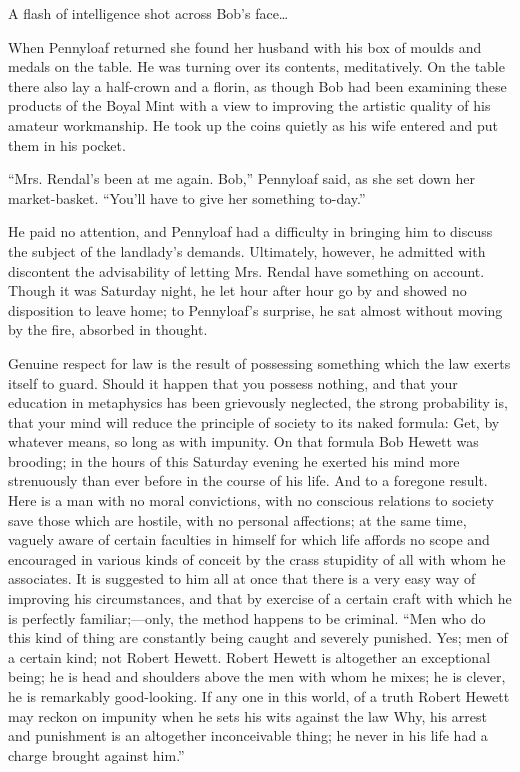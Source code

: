 A flash of intelligence shot across Bob's face\ldots{}

When Pennyloaf returned she found her husband with his box of moulds and
medals on the table. He was turning over its contents, meditatively. On
the table there also lay a half-crown and a florin, as though Bob had
been examining these products of the Boyal Mint with a view to improving
the artistic quality of his amateur workmanship. He took up the coins
quietly as his wife entered and put them in his pocket.

``Mrs. Rendal's been at me again. Bob,'' Pennyloaf said, as she set down
her market-basket. ``You'll have to give her something to-day.''

{\protect\hypertarget{235}{}{}}He paid no attention, and Pennyloaf had a
difficulty in bringing him to discuss the subject of the landlady's
demands. Ultimately, however, he admitted with discontent the
advisability of letting Mrs. Rendal have something on account. Though it
was Saturday night, he let hour after hour go by and showed no
disposition to leave home; to Pennyloaf's surprise, he sat almost
without moving by the fire, absorbed in thought.

Genuine respect for law is the result of possessing something which the
law exerts itself to guard. Should it happen that you possess nothing,
and that your education in metaphysics has been grievously neglected,
the strong probability is, that your mind will reduce the principle of
society to its naked formula: Get, by whatever means, so long as with
impunity. On that formula Bob Hewett was brooding; in the hours of this
Saturday evening he exerted his mind more strenuously than ever before
in the course of his life. And to a foregone result. Here is a man with
no moral convictions, with no conscious
{\protect\hypertarget{236}{}{}}relations to society save those which are
hostile, with no personal affections; at the same time, vaguely aware of
certain faculties in himself for which life affords no scope and
encouraged in various kinds of conceit by the crass stupidity of all
with whom he associates. It is suggested to him all at once that there
is a very easy way of improving his circumstances, and that by exercise
of a certain craft with which he is perfectly familiar;---only, the
method happens to be criminal. ``Men who do this kind of thing are
constantly being caught and severely punished. Yes; men of a certain
kind; not Robert Hewett. Robert Hewett is altogether an exceptional
being; he is head and shoulders above the men with whom he mixes; he is
clever, he is remarkably good-looking. If any one in this world, of a
truth Robert Hewett may reckon on impunity when he sets his wits against
the law Why, his arrest and punishment is an altogether inconceivable
thing; he never in his life had a charge brought against him.''

